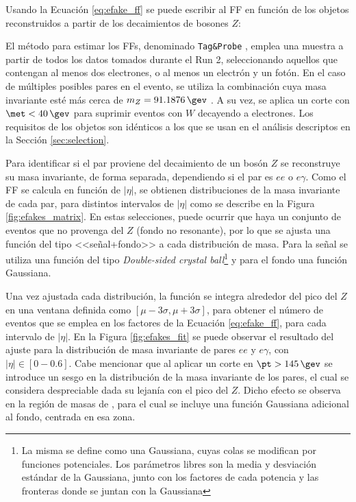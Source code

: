 Usando la Ecuación \ref{eq:efake_ff} se puede escribir al FF en función de los objetos reconstruidos a partir de los decaimientos de bosones $Z$:


El método para estimar los FFs, denominado \texttt{Tag\&Probe} \cite{tesis_gonza}, emplea una muestra a partir de todos los datos tomados durante el Run 2, seleccionando aquellos que contengan al menos dos electrones, o al menos un electrón y un fotón. En el caso de múltiples posibles pares en el evento, se utiliza la combinación cuya masa invariante esté más cerca de $m_Z=91.1876\,\gev$ \cite{ParticleDataGroup:2018ovx}. A su vez, se aplica un corte con $\met<40\,\gev$ para suprimir eventos con $W$ decayendo a electrones. Los requisitos de los objetos son idénticos a los que se usan en el análisis descriptos en la Sección \ref{sec:selection}.

Para identificar si el par proviene del decaimiento de un bosón $Z$ se reconstruye su masa invariante, de forma separada, dependiendo si el par es $ee$ o $e\gamma$. Como el FF se calcula en función de $|\eta|$, se obtienen distribuciones de la masa invariante de cada par, para distintos intervalos de $|\eta|$ como se describe en la Figura \ref{fig:efakes_matrix}. En estas selecciones, puede ocurrir que haya un conjunto de eventos que no provenga del $Z$ (fondo no resonante), por lo que se ajusta una función del tipo <<señal+fondo>> a cada distribución de masa. Para la señal se utiliza una función del tipo \textit{Double-sided crystal ball}\footnote{La misma se define como una Gaussiana, cuyas colas se modifican por funciones potenciales. Los parámetros libres son la media y desviación estándar de la Gaussiana, junto con los factores de cada potencia y las fronteras donde se juntan con la Gaussiana} \cite{Das:2016stf} y para el fondo una función Gaussiana.



Una vez ajustada cada distribución, la función se integra alrededor del pico del $Z$ en una ventana definida como $[\mu - 3\sigma, \mu + 3\sigma]$, para obtener el número de eventos que se emplea en los factores de la Ecuación \ref{eq:efake_ff}, para cada intervalo de $|\eta|$. En la Figura \ref{fig:efakes_fit} se puede observar el resultado del ajuste para la distribución de masa invariante de pares $ee$ y $e\gamma$, con $|\eta| \in [0-0.6]$. 
Cabe mencionar que al aplicar un corte en $\pt>145\,\gev$ se introduce un sesgo en la distribución de la masa invariante de los pares, el cual se considera despreciable dada su lejanía con el pico del $Z$. Dicho efecto se observa en la región de masas de , para el cual se incluye una función Gaussiana adicional al fondo, centrada en esa zona.




